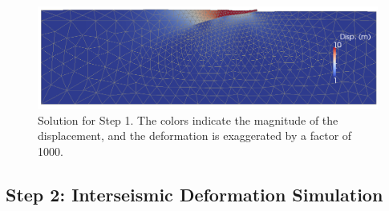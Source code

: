 \noindent \begin{center}
\begin{figure}
\begin{centering}
\includegraphics[width=4.5in]{tutorials/subduction/figs/step01_soln}
\par\end{centering}

\caption{Solution for Step 1. The colors indicate the magnitude of the displacement,
and the deformation is exaggerated by a factor of 1000. \label{fig:tutorial:subduction:step01}}
\end{figure}

\par\end{center}


\subsection{Step 2: Interseismic Deformation Simulation}

